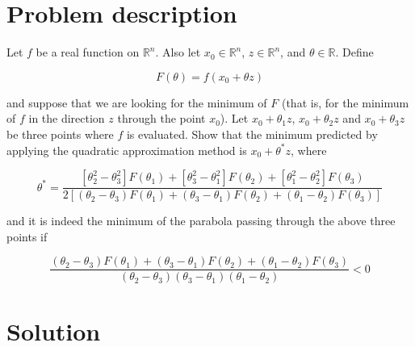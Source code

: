 \documentclass[11pt,a4paper]{article}
\begin{document}
\setlength{\parskip}{1em}


\section{Problem description}

Let $f$ be a real function on $\mathbb{R}^n$. Also let $x_0 \in \mathbb{R}^n$,
$z \in \mathbb{R}^n$, and $\theta \in \mathbb{R}$. Define

$$F(\theta) = f(x_0 + \theta z)$$

\noindent and suppose that we are looking for the minimum of $F$ (that is, for the
minimum of $f$ in the direction $z$ through the point $x_0$). Let $x_0 + \theta_1z$, 
$x_0 + \theta_2z$ and $x_0 + \theta_3z$ be three points where $f$ is evaluated.
Show that the minimum predicted by applying the quadratic approximation method is
$x_0 + \theta^* z$, where

$$ \theta^* = \frac{[\theta_2^2 - \theta_3^2]F(\theta_1) + [\theta_3^2 - \theta_1^2]F(\theta_2) + [\theta_1^2 - \theta_2^2]F(\theta_3)}{2[(\theta_2 - \theta_3)F(\theta_1) + (\theta_3 - \theta_1)F(\theta_2) + (\theta_1 - \theta_2)F(\theta_3)]}$$

\noindent and it is indeed the minimum of the parabola passing through the above three
points if

$$\frac{(\theta_2 - \theta_3)F(\theta_1) + (\theta_3 - \theta_1)F(\theta_2) + (\theta_1 - \theta_2)F(\theta_3)}{(\theta_2 - \theta_3)(\theta_3 - \theta_1)(\theta_1 - \theta_2)} < 0$$

\section{Solution}
\end{document}
